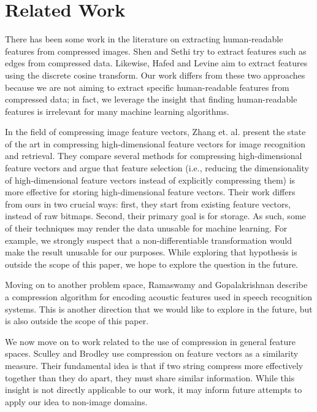 \documentclass[12pt]{article}
\begin{document}
\section{Related Work} \label{related}

There has been some work in the literature on extracting human-readable features from compressed images.  Shen and Sethi \cite{shen} try to extract features such as edges from compressed data.  Likewise, Hafed and Levine \cite{hafed} aim to extract features using the discrete cosine transform.  Our work differs from these two approaches because we are not aiming to extract specific human-readable features from compressed data; in fact, we leverage the insight that finding human-readable features is irrelevant for many machine learning algorithms.

In the field of compressing image feature vectors, Zhang et. al. \cite{zhang16} present the state of the art in compressing high-dimensional feature vectors for image recognition and retrieval.  They compare several methods for compressing high-dimensional feature vectors and argue that feature selection (i.e., reducing the dimensionality of high-dimensional feature vectors instead of explicitly compressing them) is more effective for storing high-dimensional feature vectors.  Their work differs from ours in two crucial ways: first, they start from existing feature vectors, instead of raw bitmaps.  Second, their primary goal is for storage.  As such, some of their techniques may render the data unusable for machine learning.  For example, we strongly suspect that a non-differentiable transformation would make the result unusable for our purposes.  While exploring that hypothesis is outside the scope of this paper, we hope to explore the question in the future.

Moving on to another problem space, Ramaswamy and Gopalakrishnan \cite{ramaswamy} describe a compression algorithm for encoding acoustic features used in speech recognition systems.  This is another direction that we would like to explore in the future, but is also outside the scope of this paper.

We now move on to work related to the use of compression in general feature spaces.  Sculley and Brodley \cite{sculley} use compression on feature vectors as a similarity measure.  Their fundamental idea is that if two string compress more effectively together than they do apart, they must share similar information.  While this insight is not directly applicable to our work, it may inform future attempts to apply our idea to non-image domains.
\end{document}
